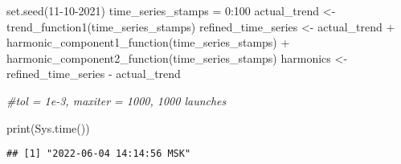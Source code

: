 \documentclass[
]{article}
\newenvironment{Shaded}{\begin{snugshade}}{\end{snugshade}}
\newcommand{\CommentTok}[1]{\textcolor[rgb]{0.56,0.35,0.01}{\textit{#1}}}
\newcommand{\DecValTok}[1]{\textcolor[rgb]{0.00,0.00,0.81}{#1}}
\newcommand{\FunctionTok}[1]{\textcolor[rgb]{0.00,0.00,0.00}{#1}}
\newcommand{\NormalTok}[1]{#1}
\newcommand{\OtherTok}[1]{\textcolor[rgb]{0.56,0.35,0.01}{#1}}
\newcommand{\SpecialCharTok}[1]{\textcolor[rgb]{0.00,0.00,0.00}{#1}}
\begin{document}
\begin{Shaded}
\begin{Highlighting}[]
    \FunctionTok{set.seed}\NormalTok{(}\DecValTok{11{-}10{-}2021}\NormalTok{)}
\NormalTok{    time\_series\_stamps }\OtherTok{=} \DecValTok{0}\SpecialCharTok{:}\DecValTok{100}
\NormalTok{    actual\_trend }\OtherTok{\textless{}{-}} \FunctionTok{trend\_function1}\NormalTok{(time\_series\_stamps)}
\NormalTok{    refined\_time\_series }\OtherTok{\textless{}{-}}\NormalTok{ actual\_trend }\SpecialCharTok{+} \FunctionTok{harmonic\_component1\_function}\NormalTok{(time\_series\_stamps) }\SpecialCharTok{+}
      \FunctionTok{harmonic\_component2\_function}\NormalTok{(time\_series\_stamps)}
\NormalTok{    harmonics }\OtherTok{\textless{}{-}}\NormalTok{ refined\_time\_series }\SpecialCharTok{{-}}\NormalTok{ actual\_trend}
\end{Highlighting}
\end{Shaded}

\begin{Shaded}
\begin{Highlighting}[]
  \CommentTok{\#tol = 1e{-}3, maxiter = 1000, 1000 launches}

  \FunctionTok{print}\NormalTok{(}\FunctionTok{Sys.time}\NormalTok{())}
\end{Highlighting}
\end{Shaded}

\begin{verbatim}
## [1] "2022-06-04 14:14:56 MSK"
\end{verbatim}
\end{document}
